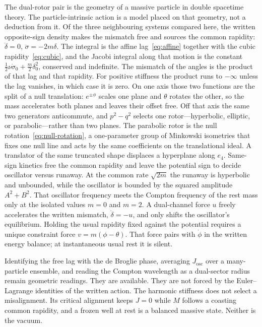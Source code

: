 \documentclass[a4paper]{article}
\begin{document}
The dual-rotor pair is the geometry of a massive particle in double spacetime theory. The particle-intrinsic action is a model placed on that geometry, not a deduction from it. Of the three neighbouring systems compared here, the written opposite-sign density makes the mismatch free and sources the common rapidity: \(\ddot\delta=0\), \(\ddot\sigma=-2m\delta\). The integral is the affine lag~\eqref{eq:affine} together with the cubic rapidity~\eqref{eq:cubic}, and the Jacobi integral along that motion is the constant \(\frac12\nu\dot\sigma_0+\frac m2\delta_0^2\), conserved and indefinite. The mismatch of the angles is the product of that lag and that rapidity. For positive stiffness the product runs to \(-\infty\) unless the lag vanishes, in which case it is zero. On one axis those two functions are the split of a null translation: \(e^{\pm\phi}\) scales one plane and \(\theta\) rotates the other, so the mass accelerates both planes and leaves their offset free. Off that axis the same two generators anticommute, and \(p^2-q^2\) selects one rotor---hyperbolic, elliptic, or parabolic---rather than two planes. The parabolic rotor is the null rotation~\eqref{eq:null-rotation}, a one-parameter group of Minkowski isometries that fixes one null line and acts by the same coefficients on the translational ideal. A translator of the same truncated shape displaces a hyperplane along \(e_4\). Same-sign kinetics free the common rapidity and leave the potential sign to decide oscillator versus runaway. At the common rate \(\sqrt{2m}\) the runaway is hyperbolic and unbounded, while the oscillator is bounded by the squared amplitude \(A^2+B^2\). That oscillator frequency meets the Compton frequency of the rest mass only at the isolated values \(m=0\) and \(m=2\). A dual-channel force \(u\) freely accelerates the written mismatch, \(\ddot\delta=-u\), and only shifts the oscillator's equilibrium. Holding the usual rapidity fixed against the potential requires a unique constraint force \(v=m(\phi-\theta)\). That force pairs with \(\dot\phi\) in the written energy balance; at instantaneous usual rest it is silent.

Identifying the free lag with the de Broglie phase, averaging \(J_{\mathrm{osc}}\) over a many-particle ensemble, and reading the Compton wavelength as a dual-sector radius remain geometric readings. They are available. They are not forced by the Euler--Lagrange identities of the written action. The harmonic stiffness does not select a misalignment. Its critical alignment keeps \(J=0\) while \(M\) follows a coasting common rapidity, and a frozen well at rest is a balanced massive state. Neither is the vacuum.
\end{document}
